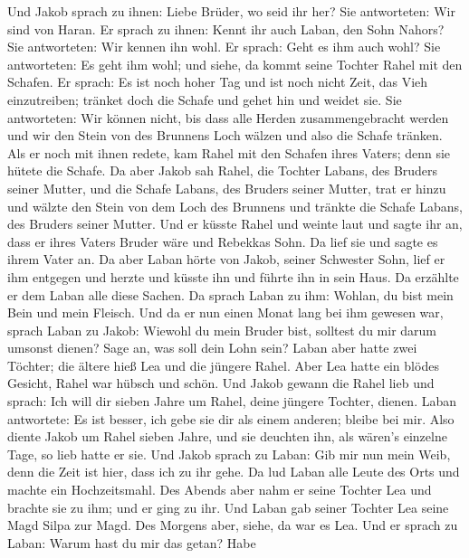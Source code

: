  Und Jakob sprach zu ihnen: Liebe Brüder, wo seid ihr her?
Sie antworteten: Wir sind von Haran.  Er sprach zu ihnen:
Kennt ihr auch Laban, den Sohn Nahors? Sie antworteten: Wir kennen ihn
wohl.  Er sprach: Geht es ihm auch wohl? Sie antworteten: Es
geht ihm wohl; und siehe, da kommt seine Tochter Rahel mit den Schafen.
 Er sprach: Es ist noch hoher Tag und ist noch nicht Zeit,
das Vieh einzutreiben; tränket doch die Schafe und gehet hin und weidet
sie.  Sie antworteten: Wir können nicht, bis dass alle
Herden zusammengebracht werden und wir den Stein von des Brunnens Loch
wälzen und also die Schafe tränken.  Als er noch mit ihnen
redete, kam Rahel mit den Schafen ihres Vaters; denn sie hütete die
Schafe.  Da aber Jakob sah Rahel, die Tochter Labans, des
Bruders seiner Mutter, und die Schafe Labans, des Bruders seiner Mutter,
trat er hinzu und wälzte den Stein von dem Loch des Brunnens und tränkte
die Schafe Labans, des Bruders seiner Mutter.  Und er
küsste Rahel und weinte laut  und sagte ihr an, dass er
ihres Vaters Bruder wäre und Rebekkas Sohn. Da lief sie und sagte es
ihrem Vater an.  Da aber Laban hörte von Jakob, seiner
Schwester Sohn, lief er ihm entgegen und herzte und küsste ihn und
führte ihn in sein Haus. Da erzählte er dem Laban alle diese Sachen.
 Da sprach Laban zu ihm: Wohlan, du bist mein Bein und mein
Fleisch. Und da er nun einen Monat lang bei ihm gewesen war,
 sprach Laban zu Jakob: Wiewohl du mein Bruder bist,
solltest du mir darum umsonst dienen? Sage an, was soll dein Lohn sein?
 Laban aber hatte zwei Töchter; die ältere hieß Lea und die
jüngere Rahel.  Aber Lea hatte ein blödes Gesicht, Rahel
war hübsch und schön.  Und Jakob gewann die Rahel lieb und
sprach: Ich will dir sieben Jahre um Rahel, deine jüngere Tochter,
dienen.  Laban antwortete: Es ist besser, ich gebe sie dir
als einem anderen; bleibe bei mir.  Also diente Jakob um
Rahel sieben Jahre, und sie deuchten ihn, als wären's einzelne Tage, so
lieb hatte er sie.  Und Jakob sprach zu Laban: Gib mir nun
mein Weib, denn die Zeit ist hier, dass ich zu ihr gehe. 
Da lud Laban alle Leute des Orts und machte ein Hochzeitsmahl.
 Des Abends aber nahm er seine Tochter Lea und brachte sie
zu ihm; und er ging zu ihr.  Und Laban gab seiner Tochter
Lea seine Magd Silpa zur Magd.  Des Morgens aber, siehe, da
war es Lea. Und er sprach zu Laban: Warum hast du mir das getan? Habe
